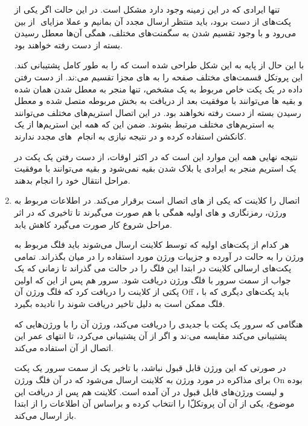 \documentclass[12pt]{article}
\begin{document}
\begin{enumerate}
	تنها ایرادی که در این زمینه وجود دارد مشکل  است. در این حالت اگر یکی از پکت‌های  از دست برود، باید منتظر ارسال مجدد آن بمانیم و عملا مزایای ‌ از بین می‌رود و با وجود تقسیم شدن به سگمنت‌های مختلف، همگی ‌آن‌ها معطل رسیدن بسته از دست رفته خواهند بود.
	
	با این حال  از پایه به این شکل طراحی شده است که  را به طور کامل پشتیبانی کند. این پروتکل قسمت‌های مختلف صفحه را به  های مجزا تقسیم می‌:ند. از دست رفتن داده در یک پکت خاص مربوط به یک  مشخص، تنها منجر به معطل شدن همان  شده و بقیه  ها می‌توانند با موفقیت بعد از دریافت به بخش مربوطه متصل شده و معطل رسیدن بسته  از دست رفته نخواهند بود. در این اتصال استریم‌های مختلف  می‌توانند به استریم‌های مختلف  مرتبط بشوند. ضمن این که همه این استریم‌ها از یک کانکشن  استفاده کرده و در نتیجه نیازی به انجام ‌ های مجدد ندارند.


نتیجه نهایی همه این موارد این است که در اکثر اوقات، از دست رفتن یک پکت در یک استریم منجر به ایرادی یا بلاک شدن بقیه نمی‌شود و بقیه می‌توانند با موفقیت مراحل انتقال خود را انجام بدهند.


\item

اتصال  را کلاینت که یکی از  های اتصال است برقرار می‌کند. در  اطلاعات مربوط به ورژن، رمزنگاری و  های اولیه همگی با هم صورت می‌گیرند تا تاخیری که در اثر مراحل شروع کار صورت می‌گیرد کاهش یابد. 

هر کدام از پکت‌های اولیه که توسط کلاینت ارسال می‌شوند باید فلگ مربوط به ورژن را به حالت  در آورده و جزییات ورژن مورد استفاده را در میان بگذراند. تمامی پکت‌های ارسالی کلاینت در ابتدا این فلگ را در حالت  می گذراند تا زمانی که یک جواب از سمت سرور با فلگ ورژن  دریافت شود. سرور هم پس از این که اولین پکتی از کلاینت را دریافت کرد که فلگ ورژن آن Off ، باید پکت‌های دیگری که با فلگ  ممکن است به دلیل تاخیر دریافت شوند را نادیده بگیرد.

هنگامی که سرور یک پکت با  جدیدی را دریافت می‌کند، ورژن آن را با ورژن‌هایی که پشتیبانی می‌کند مقایسه می‌:ند و اگر از آن پشتیبانی می‌کرد، تا انتهای عمر این اتصال از آن استفاده می‌کند.

در صورتی که این ورژن قابل قبول نباشد، با تاخیر یک  از سمت سرور یک پکت برای مذاکره در مورد ورژن به کلاینت ارسال می‌شود که در آن فلگ ورژن On بوده و لیست ورژن‌های قابل قبول در آن آمده است. کلاینت هم پس از دریافت این موضوع، یکی از آن آن پروتکل‌ّا را انتخاب کرده و براساس آن اطلاعات را از ابتدا باز ارسال می‌کند.


\end{enumerate}
\end{document}
